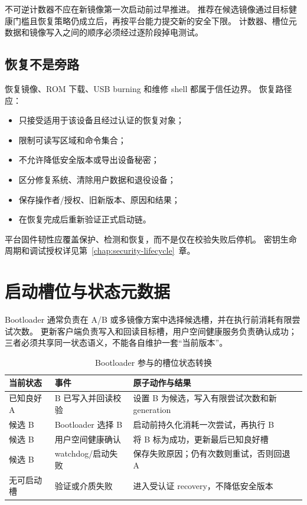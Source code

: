不可逆计数器不应在新镜像第一次启动前过早推进。
推荐在候选镜像通过目标健康门槛且恢复策略仍成立后，再按平台能力提交新的安全下限。
计数器、槽位元数据和镜像写入之间的顺序必须经过逐阶段掉电测试。

\subsection{恢复不是旁路}

恢复镜像、ROM 下载、USB burning 和维修 shell 都属于信任边界。
恢复路径应：

\begin{itemize}
  \item 只接受适用于该设备且经过认证的恢复对象；
  \item 限制可读写区域和命令集合；
  \item 不允许降低安全版本或导出设备秘密；
  \item 区分修复系统、清除用户数据和退役设备；
  \item 保存操作者/授权、旧新版本、原因和结果；
  \item 在恢复完成后重新验证正式启动链。
\end{itemize}

平台固件韧性应覆盖保护、检测和恢复，而不是仅在校验失败后停机\cite{nist-platform-resiliency}。
密钥生命周期和调试授权详见第~\ref{chap:security-lifecycle}~章。

\section{启动槽位与状态元数据}

Bootloader 通常负责在 A/B 或多镜像方案中选择候选槽，并在执行前消耗有限尝试次数。
更新客户端负责写入和回读目标槽，用户空间健康服务负责确认成功；三者必须共享同一状态语义，不能各自维护一套“当前版本”。

\begin{table}[H]
  \centering
  \caption{Bootloader 参与的槽位状态转换}
  \begin{tabular}{p{31mm}p{43mm}p{64mm}}
    \hline
    当前状态 & 事件 & 原子动作与结果 \\
    \hline
    已知良好 A & B 已写入并回读校验 & 设置 B 为候选，写入有限尝试次数和新 generation \\
    候选 B & Bootloader 选择 B & 启动前持久化消耗一次尝试，再执行 B \\
    候选 B & 用户空间健康确认 & 将 B 标为成功，更新最后已知良好槽 \\
    候选 B & watchdog/启动失败 & 保存失败原因；仍有次数则重试，否则回退 A \\
    无可启动槽 & 验证或介质失败 & 进入受认证 recovery，不降低安全版本 \\
    \hline
  \end{tabular}
\end{table}

